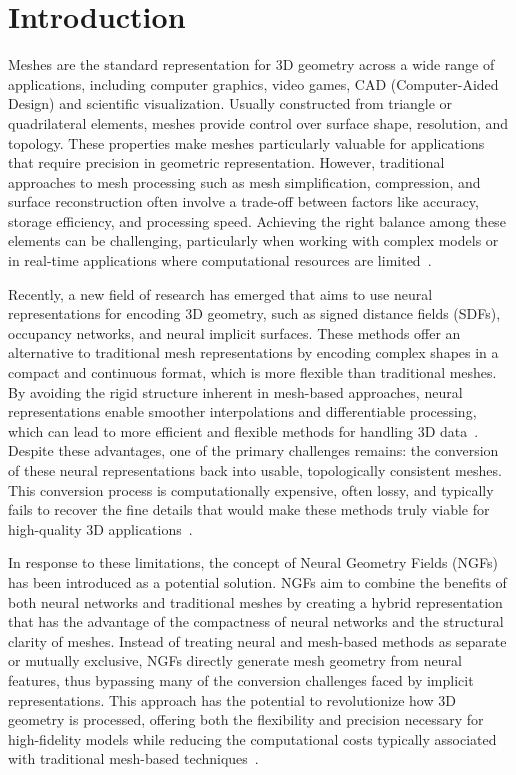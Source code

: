 \section{Introduction}
Meshes are the standard representation for 3D geometry across a wide range of applications, including computer graphics, video games, CAD (Computer-Aided Design) and scientific visualization.
Usually constructed from triangle or quadrilateral elements, meshes provide control over surface shape, resolution, and topology.
These properties make meshes particularly valuable for applications that require precision in geometric representation.
However, traditional approaches to mesh processing such as mesh simplification, compression, and surface reconstruction often involve a trade-off between factors like accuracy, storage efficiency, and processing speed.
Achieving the right balance among these elements can be challenging, particularly when working with complex models or in real-time applications where computational resources are limited~\cite{Maglo2015}.

Recently, a new field of research has emerged that aims to use neural representations for encoding 3D geometry, such as signed distance fields (SDFs), occupancy networks, and neural implicit surfaces.
These methods offer an alternative to traditional mesh representations by encoding complex shapes in a compact and continuous format, which is more flexible than traditional meshes.
By avoiding the rigid structure inherent in mesh-based approaches, neural representations enable smoother interpolations and differentiable processing, which can lead to more efficient and flexible methods for handling 3D data~\cite{Park2019}.
Despite these advantages, one of the primary challenges remains: the conversion of these neural representations back into usable, topologically consistent meshes.
This conversion process is computationally expensive, often lossy, and typically fails to recover the fine details that would make these methods truly viable for high-quality 3D applications~\cite{sivaram2024patchnets2024}.

In response to these limitations, the concept of Neural Geometry Fields (NGFs) has been introduced as a potential solution.
NGFs aim to combine the benefits of both neural networks and traditional meshes by creating a hybrid representation that has the advantage of the compactness of neural networks and the structural clarity of meshes.
Instead of treating neural and mesh-based methods as separate or mutually exclusive, NGFs directly generate mesh geometry from neural features, thus bypassing many of the conversion challenges faced by implicit representations.
This approach has the potential to revolutionize how 3D geometry is processed, offering both the flexibility and precision necessary for high-fidelity models while reducing the computational costs typically associated with traditional mesh-based techniques~\cite{sivaram2024patchnets2024}.

